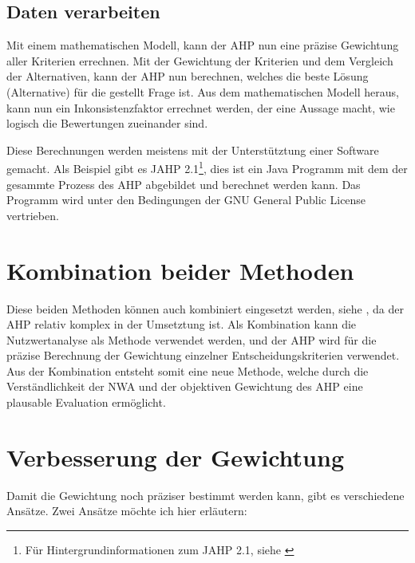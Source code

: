   \subsection{Daten verarbeiten}
  
  Mit einem mathematischen Modell, kann der \ac{AHP} nun eine präzise Gewichtung
  aller Kriterien errechnen. Mit der Gewichtung der Kriterien und dem Vergleich
  der Alternativen, kann der \ac{AHP} nun berechnen, welches die beste Lösung
  (Alternative) für die gestellt Frage ist. Aus dem mathematischen Modell
  heraus, kann nun ein Inkonsistenzfaktor errechnet werden, der eine Aussage
  macht, wie logisch die Bewertungen zueinander sind.
  
  Diese Berechnungen werden meistens mit der Unterstütztung einer Software
  gemacht. Als Beispiel gibt es JAHP 2.1\footnote{Für Hintergrundinformationen
  zum JAHP 2.1, siehe \cite{JAHP}}, dies ist ein Java Programm mit dem der
  gesammte Prozess des \ac{AHP} abgebildet und berechnet werden kann. Das
  Programm wird unter den Bedingungen der GNU General Public License
  vertrieben.
    
  \section{Kombination beider Methoden}
  
  Diese beiden Methoden können auch kombiniert eingesetzt werden, siehe
  \cite{AhpNwaKombination}, da der \ac{AHP} relativ komplex in der Umsetztung
  ist. Als Kombination kann die Nutzwertanalyse als Methode verwendet werden,
  und der \ac{AHP} wird für die präzise Berechnung der Gewichtung einzelner
  Entscheidungskriterien verwendet. Aus der Kombination entsteht somit eine
  neue Methode, welche durch die Verständlichkeit der \ac{NWA} und der
  objektiven Gewichtung des \ac{AHP} eine plausable Evaluation ermöglicht.
  
  \section{Verbesserung der 
  Gewichtung}\label{subsection:VerbesserungDerGewichtung}
  
  Damit die Gewichtung noch präziser bestimmt werden kann, gibt es verschiedene
  Ansätze. Zwei Ansätze möchte ich hier erläutern:
  
